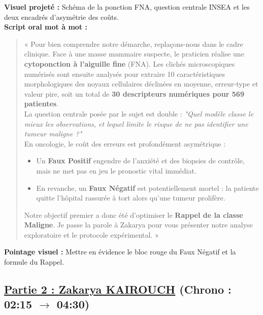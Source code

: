 \documentclass[a4paper,11pt]{article}
\begin{document}
\begin{tcolorbox}[speechbox, title={Slide 3 : Contexte Médical, FNA \& Question Centrale (01:05 -- 02:15)}]
	\textbf{Visuel projeté :} Schéma de la ponction FNA, question centrale INSEA et les deux encadrés d'asymétrie des coûts.\\
	\textbf{Script oral mot à mot :}
	\begin{quote}
		« Pour bien comprendre notre démarche, replaçons-nous dans le cadre clinique. Face à une masse mammaire suspecte, le praticien réalise une \textbf{cytoponction à l'aiguille fine} (FNA). Les clichés microscopiques numérisés sont ensuite analysés pour extraire 10 caractéristiques morphologiques des noyaux cellulaires déclinées en moyenne, erreur-type et valeur pire, soit un total de \textbf{30 descripteurs numériques pour 569 patientes}.\\
		La question centrale posée par le sujet est double : \textit{"Quel modèle classe le mieux les observations, et lequel limite le risque de ne pas identifier une tumeur maligne ?"}\\
		En oncologie, le coût des erreurs est profondément asymétrique :
		\begin{itemize}[leftmargin=0.5cm, itemsep=1pt]
			\item Un \textbf{Faux Positif} engendre de l'anxiété et des biopsies de contrôle, mais ne met pas en jeu le pronostic vital immédiat.
			\item En revanche, un \textbf{Faux Négatif} est potentiellement mortel : la patiente quitte l'hôpital rassurée à tort alors qu'une tumeur prolifère.
		\end{itemize}
		Notre objectif premier a donc été d'optimiser le \textbf{Rappel de la classe Maligne}. Je passe la parole à Zakarya pour vous présenter notre analyse exploratoire et le protocole expérimental. »
	\end{quote}
	\textbf{Pointage visuel :} Mettre en évidence le bloc rouge du Faux Négatif et la formule du Rappel.
\end{tcolorbox}

\subsection*{\color{primarygreen}\underline{Partie 2 : Zakarya KAIROUCH} (Chrono : 02:15 $\to$ 04:30)}
\end{document}
